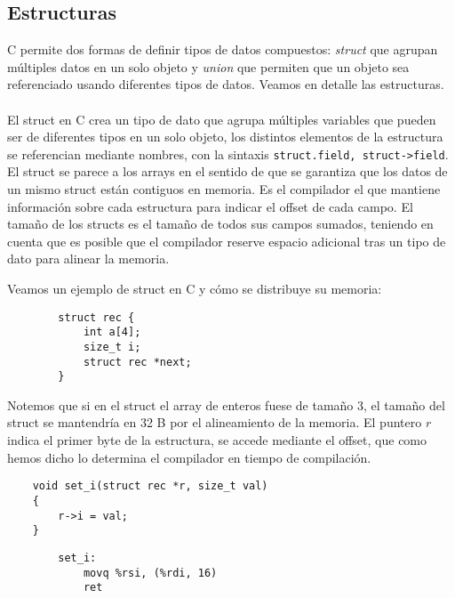 \subsection{Estructuras}
C permite dos formas de definir tipos de datos compuestos: \textit{struct} que agrupan múltiples datos en un 
solo objeto y \textit{union} que permiten que un objeto sea referenciado usando diferentes tipos de datos. Veamos en detalle las estructuras.
\\ \\ 
El struct en C crea un tipo de dato que agrupa múltiples variables que pueden ser de diferentes tipos en un solo objeto,
los distintos elementos de la estructura se referencian mediante nombres, con la sintaxis \texttt{struct.field, struct->field}.
El struct se parece a los arrays en el sentido de que se garantiza que los datos de un mismo struct están contiguos en memoria.
Es el compilador el que mantiene información sobre cada estructura para indicar el offset de cada campo. El tamaño de los 
structs es el tamaño de todos sus campos sumados, teniendo en cuenta que es posible que el compilador reserve espacio adicional tras un 
tipo de dato para alinear la memoria.
\begin{ejemplo}
    Veamos un ejemplo de struct en C y cómo se distribuye su memoria:
    \begin{center}
        \begin{minipage}{0.45\textwidth}
            \begin{verbatim}
        struct rec {
            int a[4];
            size_t i;
            struct rec *next;
        }
            \end{verbatim}
        \end{minipage}
        \begin{minipage}{0.48\textwidth}
            
        \end{minipage}
    \end{center}
        Notemos que si en el struct el array de enteros fuese de tamaño 3, el tamaño del struct se mantendría en 32
        B por el alineamiento de la memoria. El puntero $r$ indica el primer byte de la estructura, se accede
        mediante el offset, que como hemos dicho lo determina el compilador en tiempo de compilación.
        \begin{center}
        \begin{minipage}{0.48\textwidth}
            \begin{verbatim}
    void set_i(struct rec *r, size_t val)
    {
        r->i = val;
    }
            \end{verbatim}
        \end{minipage}
        \begin{minipage}{0.45\textwidth}
            \begin{verbatim}
        set_i:
            movq %rsi, (%rdi, 16)
            ret
            \end{verbatim} 
        \end{minipage}
    \end{center}
\end{ejemplo}
